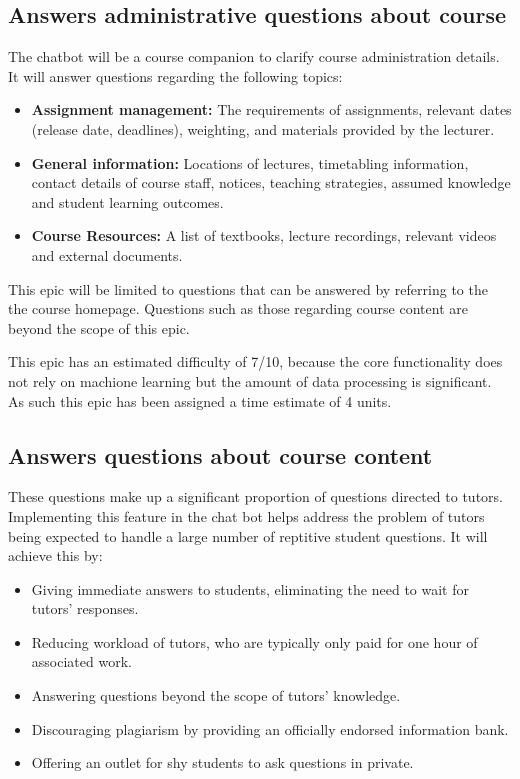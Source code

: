 \documentclass{article}
\begin{document}
\subsection{Answers administrative questions about course}

The chatbot will be a course companion to clarify course administration details. It will answer questions regarding the following topics:
\begin{itemize}
  \item \textbf{Assignment management:} The requirements of assignments, relevant dates (release date, deadlines), weighting, and materials provided by the lecturer.
  \item \textbf{General information:} Locations of lectures, timetabling information, contact details of course staff, notices, teaching strategies, assumed knowledge and student learning outcomes.
  \item \textbf{Course Resources:} A list of textbooks, lecture recordings, relevant videos and external documents. 
\end{itemize}

This epic will be limited to questions that can be answered by referring to the the course homepage. Questions such as those regarding course content are beyond the scope of this epic.

This epic has an estimated difficulty of 7/10, because the core functionality does not rely on machione learning but the amount of data processing is significant. As such this epic has been assigned a time estimate of 4 units. 

\subsection{Answers questions about course content}
These questions make up a significant proportion of questions directed to tutors. Implementing this feature in the chat bot helps address the problem of tutors being expected to handle a large number of reptitive student questions. It will achieve this by:
\begin{itemize}
  \item Giving immediate answers to students, eliminating the need to wait for tutors' responses.
  \item Reducing workload of tutors, who are typically only paid for one hour of associated work.
  \item Answering questions beyond the scope of tutors' knowledge.
  \item Discouraging plagiarism by providing an officially endorsed information bank.
  \item Offering an outlet for shy students to ask questions in private.
\end{itemize}
\end{document}
